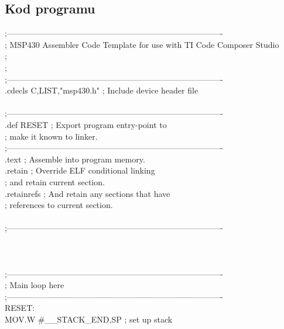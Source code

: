 \documentclass[a4paper,titlepage,11pt,floatssmall]{mwrep}
\begin{document}
\subsection{Kod programu}
\medskip
\noindent
;-------------------------------------------------------------------------------\\
; MSP430 Assembler Code Template for use with TI Code Composer Studio\\
;\\
;\\
;-------------------------------------------------------------------------------\\
            .cdecls C,LIST,"msp430.h"       ; Include device header file\\
            \\
;-------------------------------------------------------------------------------\\
            .def    RESET                   ; Export program entry-point to\\
                                            ; make it known to linker.\\
;-------------------------------------------------------------------------------\\
            .text                           ; Assemble into program memory.\\
            .retain                         ; Override ELF conditional linking\\
                                            ; and retain current section.\\
            .retainrefs                     ; And retain any sections that have\\
                                            ; references to current section.\\
\\
;-------------------------------------------------------------------------------\\
\\
\\
\\
;-------------------------------------------------------------------------------\\
; Main loop here\\
;-------------------------------------------------------------------------------\\
RESET:\\
        MOV.W   \#\_{}\_{}STACK\_END,SP        ; set up stack\\
\end{document}
